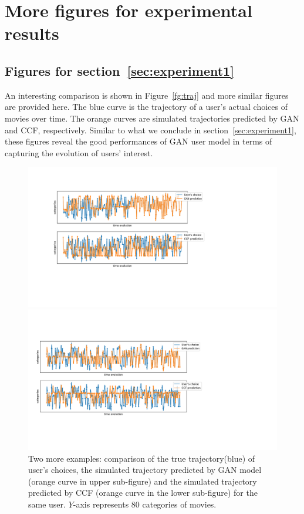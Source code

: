 \documentclass{article} %
\begin{document}
\section{More figures for experimental results}\label{app:experiment}
\subsection{Figures for section~\ref{sec:experiment1}}\label{app:exp_usermodel}
An interesting comparison is shown in Figure~\ref{fg:traj} and more similar figures are provided here. The blue curve is the trajectory of a user's actual choices of movies over time. The orange curves are simulated trajectories predicted by GAN and CCF, respectively. Similar to what we conclude in section~\ref{sec:experiment1}, these figures reveal the good performances of GAN user model in terms of capturing the evolution of users' interest. 
\begin{figure}[htbp]
  \begin{minipage}[c]{0.47\textwidth}
    \centering
    \includegraphics[width=\textwidth]{user18_new}
  \end{minipage}\hfill
  \begin{minipage}[c]{0.52\textwidth}
    \centering
        \includegraphics[width=\textwidth]{user19_new}
  \end{minipage}
  \caption{\small Two more examples: comparison of the true trajectory(blue) of user's choices, the simulated trajectory predicted by GAN model (orange curve in upper sub-figure) and the simulated trajectory predicted by CCF (orange curve in the lower sub-figure) for the same user. $Y$-axis represents 80 categories of movies.
    }
\end{figure}
\end{document}
